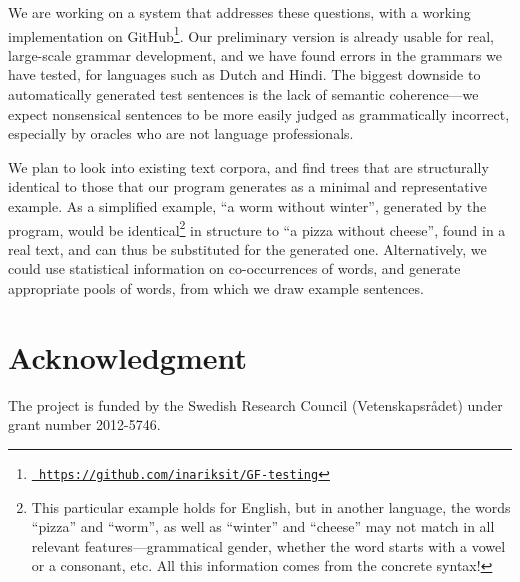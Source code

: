 \documentclass[conference]{IEEEtran}
\begin{document}
We are working on a system that addresses these questions, with a working implementation on GitHub\footnote{\texttt{\small \url{ https://github.com/inariksit/GF-testing}}}. 
Our preliminary version is already usable for real, large-scale grammar development, and we have found errors in the grammars we have tested, for languages such as Dutch and Hindi.
The biggest downside to automatically generated test sentences is the lack of semantic coherence---we expect nonsensical sentences to be more easily judged as grammatically incorrect, especially by oracles who are not language professionals.

We plan to look into existing text corpora, and find trees that are structurally identical  to those that our program generates as a minimal and representative example. As a simplified example, ``a worm without winter'', generated by the program, would be identical\footnote{This particular example holds for English, but in another language, the words ``pizza'' and ``worm'', as well as ``winter'' and ``cheese'' may not match in all relevant features---grammatical gender, whether the word starts with a vowel or a consonant, etc. All this information comes from the concrete syntax!}
 in structure to ``a pizza without cheese'', found in a real text, and can thus be substituted for the generated one.  
Alternatively, we could use statistical information on co-occurrences of words, and generate appropriate pools of words, from which we draw example sentences.















\section*{Acknowledgment}

The project is funded by the Swedish Research Council (Vetenskapsr\r{a}det) under grant number 2012-5746.
\end{document}

